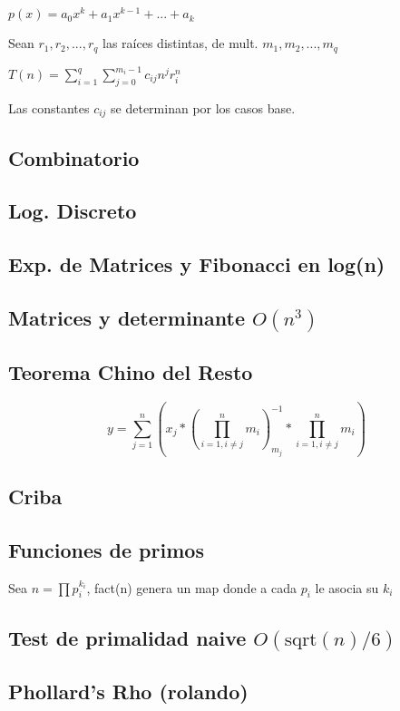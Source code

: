 $p(x)=a_0 x^k + a_1 x^{k-1} + ... + a_k$

Sean $r_1,r_2,...,r_q$ las raíces distintas, de mult. $m_1, m_2, ..., m_q$

$T(n)=\sum_{i=1}^q{\sum_{j=0}^{m_i - 1}c_{ij} n^j r_i^n}$

Las constantes $c_{ij}$ se determinan por los casos base.
\subsection{Combinatorio}
\subsection{Log. Discreto}
\subsection{Exp. de Matrices y Fibonacci en log(n)}
\subsection{Matrices y determinante $O(n^3)$}
\subsection{Teorema Chino del Resto}
$$y=\sum_{j=1}^n (x_j*(\prod_{i=1, i\neq j}^n m_i)_{m_j}^{-1}*\prod_{i=1, i\neq j}^n m_i)$$
\subsection{Criba}
\subsection{Funciones de primos}
Sea $n=\prod{p_i^{k_i}}$, fact(n) genera un map donde a cada $p_i$ le asocia su $k_i$
\subsection{Test de primalidad naive $O\left(\textrm{sqrt}(n)/6\right)$}
\subsection{Phollard's Rho (rolando)}
